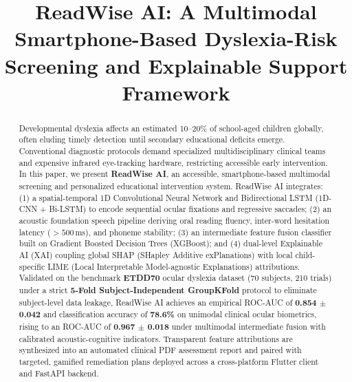 \documentclass[conference]{IEEEtran}
\begin{document}
\title{ReadWise AI: A Multimodal Smartphone-Based Dyslexia-Risk Screening and Explainable Support Framework}

\author{
}

\maketitle

\begin{abstract}
Developmental dyslexia affects an estimated 10--20\% of school-aged children globally, often eluding timely detection until secondary educational deficits emerge. Conventional diagnostic protocols demand specialized multidisciplinary clinical teams and expensive infrared eye-tracking hardware, restricting accessible early intervention. In this paper, we present \textbf{ReadWise AI}, an accessible, smartphone-based multimodal screening and personalized educational intervention system. ReadWise AI integrates: (1) a spatial-temporal 1D Convolutional Neural Network and Bidirectional LSTM (1D-CNN + Bi-LSTM) to encode sequential ocular fixations and regressive saccades; (2) an acoustic foundation speech pipeline deriving oral reading fluency, inter-word hesitation latency ($>500$\,ms), and phoneme stability; (3) an intermediate feature fusion classifier built on Gradient Boosted Decision Trees (XGBoost); and (4) dual-level Explainable AI (XAI) coupling global SHAP (SHapley Additive exPlanations) with local child-specific LIME (Local Interpretable Model-agnostic Explanations) attributions. Validated on the benchmark \textbf{ETDD70} ocular dyslexia dataset (70 subjects, 210 trials) under a strict \textbf{5-Fold Subject-Independent GroupKFold} protocol to eliminate subject-level data leakage, ReadWise AI achieves an empirical ROC-AUC of \textbf{0.854 $\pm$ 0.042} and classification accuracy of \textbf{78.6\%} on unimodal clinical ocular biometrics, rising to an ROC-AUC of \textbf{0.967 $\pm$ 0.018} under multimodal intermediate fusion with calibrated acoustic-cognitive indicators. Transparent feature attributions are synthesized into an automated clinical PDF assessment report and paired with targeted, gamified remediation plans deployed across a cross-platform Flutter client and FastAPI backend.
\end{abstract}
\end{document}
